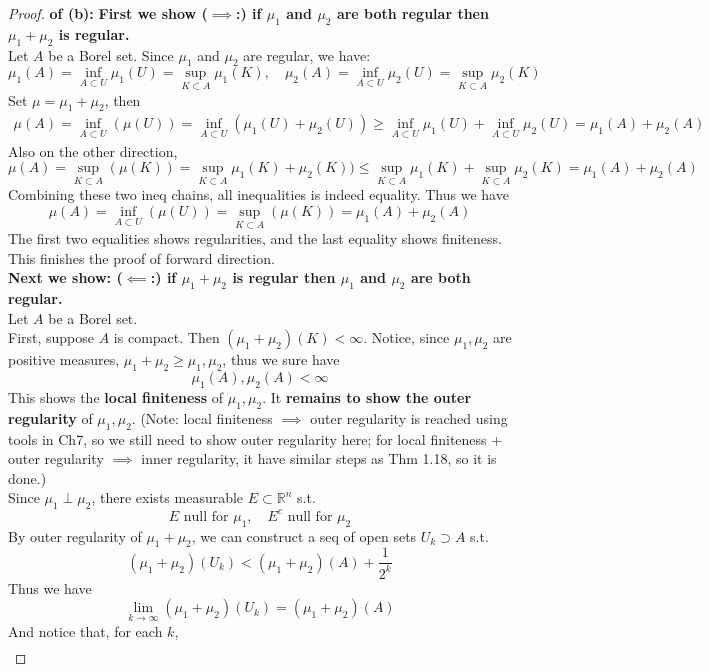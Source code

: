 \documentclass[lang=cn,11pt]{elegantbook}
\begin{document}
\begin{proof}
    \textbf{of (b):}
 \textbf{ First we show  ($\implies$:) if $\mu_1$ and $\mu_2$ are both regular then $\mu_1+\mu_2$ is regular.}\\
Let \(A\) be a Borel set. Since \(\mu_1\) and \(\mu_2\) are regular, we have:
\[
\mu_1(A) = \inf_{A \subset U} \mu_1(U) = \sup_{K \subset A} \mu_1(K), \quad
\mu_2(A) = \inf_{A \subset U} \mu_2(U) = \sup_{K \subset A} \mu_2(K)
\]
Set $\mu = \mu_1  + \mu_2$, then
\begin{align*}
    \mu(A) = \inf_{A \subset U} (\mu(U) ) =\inf_{A \subset U} (\mu_1(U) + \mu_2(U)) \geq \inf_{A \subset U} \mu_1(U) + \inf_{A \subset U} \mu_2(U) = \mu_1(A) + \mu_2(A)
\end{align*}
Also on the other direction, \[
    \mu(A) = \sup_{K \subset A} (\mu(K) ) =\sup_{K \subset A} \mu_1(K) + \mu_2(K)) \leq \sup_{K \subset A} \mu_1(K) + \sup_{K \subset A} \mu_2(K) = \mu_1(A) + \mu_2(A)
\]
Combining these two ineq chains, all inequalities is indeed equality. Thus we have \[
\mu(A) = \inf_{A \subset U} (\mu(U) ) =  \sup_{K \subset A} (\mu(K) ) = \mu_1(A) + \mu_2(A)
\]
The first two equalities shows regularities, and the last equality shows finiteness. This finishes the proof of forward direction.\\
\textbf{Next we show: ($\impliedby$:) if $\mu_1+\mu_2$ is regular then $\mu_1$ and $\mu_2$ are both regular.}\\
Let \(A\) be a Borel set.\\
First, suppose $A$ is compact. Then \((\mu_1  + \mu_2) (K) < \infty\). Notice, since $\mu_1,\mu_2$ are positive measures, $\mu_1 + \mu_2 \geq \mu_1,\mu_2$, thus we sure have\[
\mu_1(A), \mu_2(A) < \infty
\]This shows the\textbf{ local finiteness} of $\mu_1, \mu_2$. It \textbf{remains to show the outer regularity} of $\mu_1,\mu_2$. (Note: local finiteness $\implies$ outer regularity is reached using tools in Ch7, so we still need to show outer regularity here; for local finiteness +  outer regularity $\implies$ inner regularity, it have similar steps as Thm 1.18, so it is done.)\\
Since $\mu_1 \perp \mu_2$, there exists measurable $E \subset \mathbb{R}^n$ s.t. \[
E \text{ null for } \mu_1,\quad E^c  \text{ null for } \mu_2
\]
By outer regularity of  $\mu_1+\mu_2$, we can construct a seq of open sets \(U_k \supset A \) s.t. \[
(\mu_1 + \mu_2)(U_k) < (\mu_1 + \mu_2)(A) + \frac{1}{2^k}
\]
Thus we have \[
\lim_{k\to \infty}(\mu_1 + \mu_2)(U_k) = (\mu_1 + \mu_2)(A)
\]
And notice that, for each $k$,
\begin{align*}

\end{align*}
\end{proof}
\end{document}
